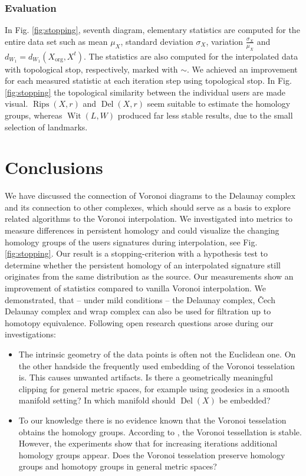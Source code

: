 \documentclass[runningheads]{llncs}
\DeclareMathOperator{\Rips}{\text{Rips}}
\DeclareMathOperator{\Del}{\text{Del}}
\DeclareMathOperator{\Wit}{\text{Wit}}
\begin{document}
\subsubsection{Evaluation} In Fig. \ref{fig:stopping}, seventh diagram, elementary statistics are computed for the entire data set such as mean $\mu_X$, standard deviation $\sigma_X$, variation $\frac{\sigma_X}{\mu_X}$ and $d_{W_1} = d_{W_1}(X_{\text{org}},X^{t})$. The statistics are also computed for the interpolated data with topological stop, respectively, marked with $\sim$. We achieved an improvement for each measured statistic at each iteration step using topological stop. In Fig. \ref{fig:stopping} the topological similarity between the individual users are made visual. $\Rips(X,r)$ and $\Del(X,r)$ seem suitable to estimate the homology groups, whereas $\Wit(L,W)$ produced far less stable results, due to the small selection of landmarks.

\section{Conclusions}
\label{sec:conclusion}
We have discussed the connection of Voronoi diagrams to the Delaunay complex and its connection to other complexes, which should serve as a basis to explore related algorithms to the Voronoi interpolation. We investigated into metrics to measure differences in persistent homology and could visualize the changing homology groups of the users signatures during interpolation, see Fig. \ref{fig:stopping}.
Our result is a stopping-criterion with a hypothesis test to determine whether the persistent homology of an interpolated signature still originates from the same distribution as the source. Our measurements show an improvement of statistics compared to vanilla Voronoi interpolation. We demonstrated, that -- under mild conditions -- the Delaunay complex, \v{C}ech Delaunay complex and wrap complex can also be used for filtration up to homotopy equivalence. Following open research questions arose during our investigations:
\begin{itemize}
  \item The intrinsic geometry of the data points is often not the Euclidean one. On the other handside the frequently used embedding of the Voronoi tesselation is. This causes unwanted artifacts. Is there a geometrically meaningful clipping for general metric spaces, for example using geodesics in a smooth manifold setting? In which manifold should $\Del(X)$ be embedded?
  \item To our knowledge there is no evidence known that the Voronoi tesselation obtains the homology groups. According to \cite{reem2011geometric}, the Voronoi tessellation is stable. However, the experiments show that for increasing iterations additional homology groups appear. Does the Voronoi tesselation preserve homology groups and homotopy groups in general metric spaces?
\end{itemize}
%
%


\end{document}
